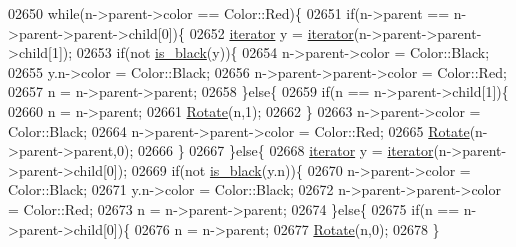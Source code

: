 \begin{DoxyCode}
02650         \textcolor{keywordflow}{while}(n->parent->color == Color::Red)\{
02651             \textcolor{keywordflow}{if}(n->parent == n->parent->parent->child[0])\{
02652                 \hyperlink{classaed2_1_1map_1_1iterator_acdd790eb54216601a2e0591776004dba_acdd790eb54216601a2e0591776004dba}{iterator} y = \hyperlink{classaed2_1_1map_1_1iterator_acdd790eb54216601a2e0591776004dba_acdd790eb54216601a2e0591776004dba}{iterator}(n->parent->parent->child[1]);
02653                 \textcolor{keywordflow}{if}(not \hyperlink{classaed2_1_1map_aa749744eb0e858c97ac1571d49925012_aa749744eb0e858c97ac1571d49925012}{is\_black}(y))\{
02654                     n->parent->color = Color::Black;
02655                     y.n->color = Color::Black;
02656                     n->parent->parent->color = Color::Red;
02657                     n = n->parent->parent;
02658                 \}\textcolor{keywordflow}{else}\{
02659                     \textcolor{keywordflow}{if}(n == n->parent->child[1])\{
02660                         n = n->parent;
02661                         \hyperlink{classaed2_1_1map_a54b1ea9f8c707232c744a4ac5c5302d2_a54b1ea9f8c707232c744a4ac5c5302d2}{Rotate}(n,1);
02662                     \}
02663                     n->parent->color = Color::Black;
02664                     n->parent->parent->color = Color::Red;
02665                     \hyperlink{classaed2_1_1map_a54b1ea9f8c707232c744a4ac5c5302d2_a54b1ea9f8c707232c744a4ac5c5302d2}{Rotate}(n->parent->parent,0);
02666                 \}
02667             \}\textcolor{keywordflow}{else}\{
02668                 \hyperlink{classaed2_1_1map_1_1iterator_acdd790eb54216601a2e0591776004dba_acdd790eb54216601a2e0591776004dba}{iterator} y = \hyperlink{classaed2_1_1map_1_1iterator_acdd790eb54216601a2e0591776004dba_acdd790eb54216601a2e0591776004dba}{iterator}(n->parent->parent->child[0]);
02669                 \textcolor{keywordflow}{if}(not \hyperlink{classaed2_1_1map_aa749744eb0e858c97ac1571d49925012_aa749744eb0e858c97ac1571d49925012}{is\_black}(y.n))\{
02670                     n->parent->color = Color::Black;
02671                     y.n->color = Color::Black;
02672                     n->parent->parent->color = Color::Red;
02673                     n = n->parent->parent;
02674                 \}\textcolor{keywordflow}{else}\{
02675                     \textcolor{keywordflow}{if}(n == n->parent->child[0])\{
02676                         n = n->parent;
02677                         \hyperlink{classaed2_1_1map_a54b1ea9f8c707232c744a4ac5c5302d2_a54b1ea9f8c707232c744a4ac5c5302d2}{Rotate}(n,0);
02678                     \}

\end{DoxyCode}
